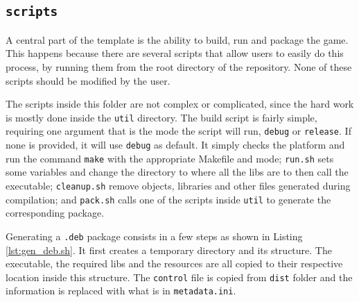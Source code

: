 \subsection{\texttt{scripts}}
\label{sec:scripts_folder}

A central part of the template is the ability to build, run and package the game. This happens because there are several scripts that allow users to easily do this process, by running them from the root directory of the repository. None of these scripts should be modified by the user.

The scripts inside this folder are not complex or complicated, since the hard work is mostly done inside the \texttt{util} directory. The build script is fairly simple, requiring one argument that is the mode the script will run, \texttt{debug} or \texttt{release}. If none is provided, it will use \texttt{debug} as default. It simply checks the platform and run the command \texttt{make} with the appropriate Makefile and mode; \texttt{run.sh} sets some variables and change the directory to where all the libs are to then call the executable; \texttt{cleanup.sh} remove objects, libraries and other files generated during compilation; and \texttt{pack.sh} calls one of the scripts inside \texttt{util} to generate the corresponding package.



Generating a \texttt{.deb} package consists in a few steps as shown in Listing \ref{lst:gen_deb.sh}. It first creates a temporary directory and its structure. The executable, the required libs and the resources are all copied to their respective location inside this structure. The \texttt{control} file is copied from \texttt{dist} folder and the information is replaced with what is in \texttt{metadata.ini}.



% 








